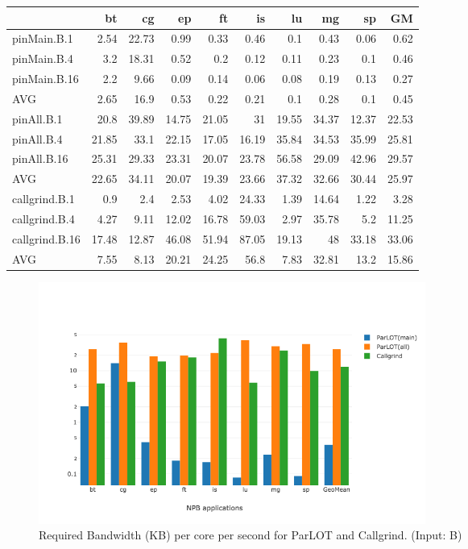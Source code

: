 \begin{table}[]
\label{bw_pMpAcg_B_itn_p3.5} 
\begin{center}
\begin{tabular}{|l|rrrrrrrr|r|}
\hline
                &    bt &    cg &    ep &    ft &    is &    lu &    mg &    sp &    GM \\
\hline
 pinMain.B.1    &  2.54 & 22.73 &  0.99 &  0.33 &  0.46 &   0.1 &  0.43 &  0.06 &  0.62 \\
 pinMain.B.4    &   3.2 & 18.31 &  0.52 &   0.2 &  0.12 &  0.11 &  0.23 &   0.1 &  0.46 \\
 pinMain.B.16   &   2.2 &  9.66 &  0.09 &  0.14 &  0.06 &  0.08 &  0.19 &  0.13 &  0.27 \\
 \hline
 AVG            &  2.65 &  16.9 &  0.53 &  0.22 &  0.21 &   0.1 &  0.28 &   0.1 &  0.45 \\
 \hline
 pinAll.B.1     &  20.8 & 39.89 & 14.75 & 21.05 &    31 & 19.55 & 34.37 & 12.37 & 22.53 \\
 pinAll.B.4     & 21.85 &  33.1 & 22.15 & 17.05 & 16.19 & 35.84 & 34.53 & 35.99 & 25.81 \\
 pinAll.B.16    & 25.31 & 29.33 & 23.31 & 20.07 & 23.78 & 56.58 & 29.09 & 42.96 & 29.57 \\
 \hline
 AVG            & 22.65 & 34.11 & 20.07 & 19.39 & 23.66 & 37.32 & 32.66 & 30.44 & 25.97 \\
 \hline
 callgrind.B.1  &   0.9 &   2.4 &  2.53 &  4.02 & 24.33 &  1.39 & 14.64 &  1.22 &  3.28 \\
 callgrind.B.4  &  4.27 &  9.11 & 12.02 & 16.78 & 59.03 &  2.97 & 35.78 &   5.2 & 11.25 \\
 callgrind.B.16 & 17.48 & 12.87 & 46.08 & 51.94 & 87.05 & 19.13 &    48 & 33.18 & 33.06 \\
 \hline
 AVG            &  7.55 &  8.13 & 20.21 & 24.25 &  56.8 &  7.83 & 32.81 &  13.2 & 15.86 \\
\hline
\end{tabular}
\end{center}
\end{table}



\begin{figure}[!t]
\centering
\includegraphics[width=5in]{figs.psc/chartAvg_bw_B_p3_5.png}
\caption{ Required Bandwidth (KB) per core per second for ParLOT and Callgrind.  
(Input: B)}
\label{chartAvg_bw_B_p3_5}
\end{figure}